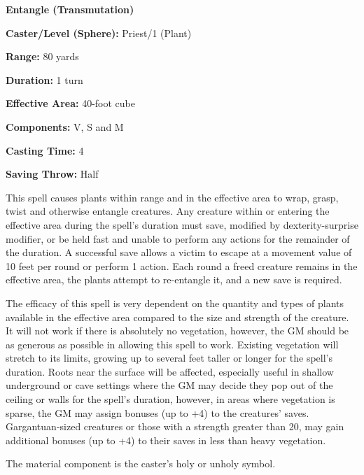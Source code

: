 \begin{multicols}{2}
\vspace{1em}

\noindent
\begin{minipage}{\columnwidth}

\noindent \textbf{Entangle (Transmutation)}

\noindent \textbf{Caster/Level (Sphere):} Priest/1 (Plant)

\noindent \textbf{Range:} 80 yards

\noindent \textbf{Duration:} 1 turn

\noindent \textbf{Effective Area:} 40-foot cube

\noindent \textbf{Components:} V, S and M

\noindent \textbf{Casting Time:} 4

\noindent \textbf{Saving Throw:} Half

\end{minipage}

This spell causes plants within range and in the effective area to wrap, grasp, twist and otherwise entangle creatures.  Any creature within or entering the effective area during the spell's duration must save, modified by dexterity-surprise modifier, or be held fast and unable to perform any actions for the remainder of the duration.  A successful save allows a victim to escape at a movement value of 10 feet per round or perform 1 action.  Each round a freed creature remains in the effective area, the plants attempt to re-entangle it, and a new save is required. 

The efficacy of this spell is very dependent on the quantity and types of plants available in the effective area compared to the size and strength of the creature.  It will not work if there is absolutely no vegetation, however, the GM should be as generous as possible in allowing this spell to work.  Existing vegetation will stretch to its limits, growing up to several feet taller or longer for the spell's duration.  Roots near the surface will be affected, especially useful in shallow underground or cave settings where the GM may decide they pop out of the ceiling or walls for the spell's duration, however, in areas where vegetation is sparse, the GM may assign bonuses (up to +4) to the creatures' saves.  Gargantuan-sized creatures or those with a strength greater than 20, may gain additional bonuses (up to +4) to their saves in less than heavy vegetation.

The material component is the caster's holy or unholy symbol.


\end{multicols}
